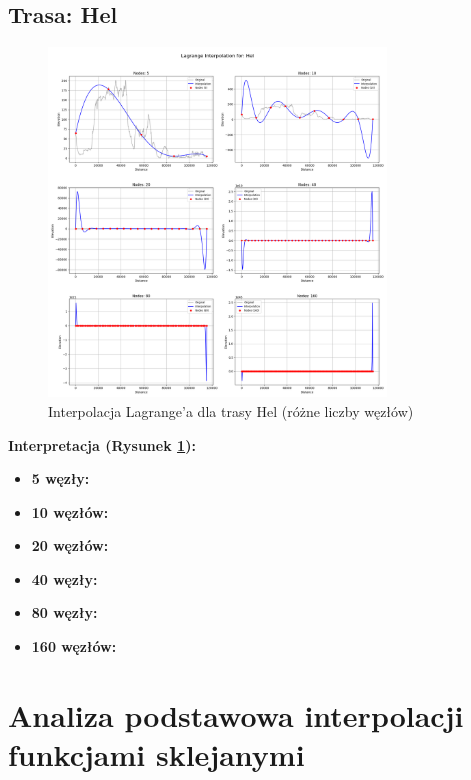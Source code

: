 \documentclass[11pt,a4paper]{article}
\begin{document}
\subsection{Trasa: Hel}
\begin{figure}[H]
    \centering
    \includegraphics[width=0.8\textwidth]{plots/Hel_Lagrange_basic.png}
    \caption{Interpolacja Lagrange'a dla trasy Hel (różne liczby węzłów)}
    \label{fig:hel_lagrange}
\end{figure}
\textbf{Interpretacja (Rysunek \ref{fig:hel_lagrange}):} 
\begin{itemize}
    \item \textbf{5 węzły:} 
    \item \textbf{10 węzłów:} 
    \item \textbf{20 węzłów:} 
    \item \textbf{40 węzły:} 
    \item \textbf{80 węzły:} 
    \item \textbf{160 węzłów:} 
\end{itemize}

\section{Analiza podstawowa interpolacji funkcjami sklejanymi}
\end{document}
